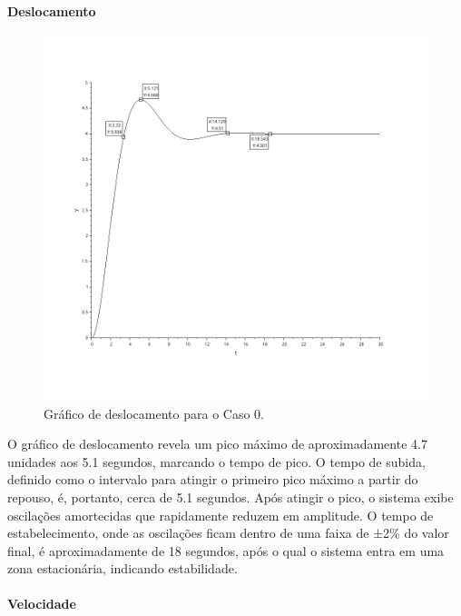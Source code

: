 \paragraph{Deslocamento}
\begin{figure}[H]
    \centering
    \includegraphics[height=0.7\textwidth]{atividades/2-atividade/assets/deslocamento-caso-0.png}
    \caption{Gráfico de deslocamento para o Caso 0.}
\end{figure}
O gráfico de deslocamento revela um pico máximo de aproximadamente 4.7 unidades aos 5.1 segundos, marcando o tempo de pico. O tempo de subida, definido como o intervalo para atingir o primeiro pico máximo a partir do repouso, é, portanto, cerca de 5.1 segundos. Após atingir o pico, o sistema exibe oscilações amortecidas que rapidamente reduzem em amplitude. O tempo de estabelecimento, onde as oscilações ficam dentro de uma faixa de ±2\% do valor final, é aproximadamente de 18 segundos, após o qual o sistema entra em uma zona estacionária, indicando estabilidade.

\paragraph{Velocidade}

